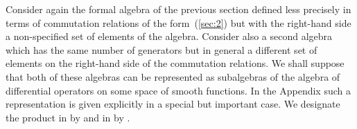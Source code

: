 \documentclass[a4paper,12pt]{article}
\def\h#1{\hat #1}
\def\t#1{\tilde #1}
\def\c#1{{\cal #1}}
\def\t#1{\tilde #1}
\begin{document}
Consider again the formal algebra \myHighlight{$\c{A}$}\coordHE{} of the previous section
defined less precisely in terms of commutation relations of the
form~(\ref{sec:2}) but with the right-hand side a non-specified set of
elements of the algebra. Consider also a second algebra \myHighlight{$\h{\c}{A}$}\coordHE{}
which has the same number of generators \myHighlight{$\h{x}^i$}\coordHE{} but in general a
different set of elements \myHighlight{$\h{J}^{ij}$}\coordHE{} on the right-hand side of the
commutation relations. We shall suppose that both of these algebras
can be represented as subalgebras of the algebra of differential
operators \myHighlight{$\t{\c}{A}$}\coordHE{} on some space of smooth functions. In the
Appendix such a representation is given explicitly in a special but
important case. We designate the product in \myHighlight{$\c{A}$}\coordHE{} by \myHighlight{$*$}\coordHE{} and in
\myHighlight{$\h{\c}{A}$}\coordHE{} by \myHighlight{$\hat *$}\coordHE{}.
\end{document}
